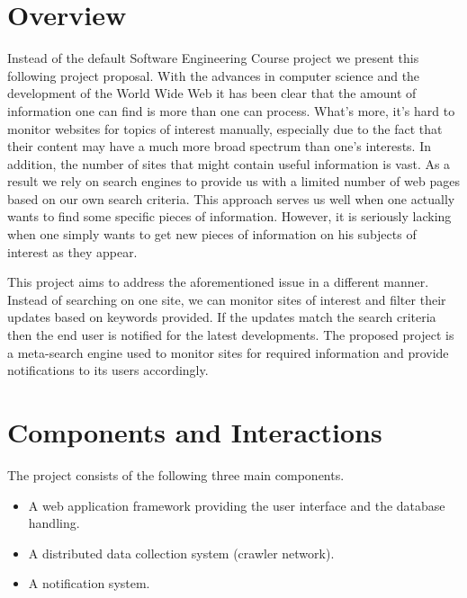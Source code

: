 \documentclass[a4paper,10pt]{article} \usepackage{anysize}
\begin{document}



\section{Overview}
    Instead of the default Software Engineering Course project we present
    this following project proposal. With the advances in computer science and
    the development of the World Wide Web it has been clear that the amount
    of information one can find is more than one can process. What's more, it's
    hard to monitor websites for topics of interest manually, especially due to
    the fact that their content may have a much more broad spectrum than one's
    interests. In addition, the number of sites that might contain useful
    information is vast. As a result we rely on search engines to provide us
    with a limited number of web pages based on our own search criteria. This
    approach serves us well when one actually wants to find some specific
    pieces of information. However, it is seriously lacking when one simply
    wants to get new pieces of information on his subjects of interest as they
    appear. 

    This project aims to address the aforementioned issue in a different
    manner. Instead of searching on one site, we can monitor sites of
    interest and filter their updates based on keywords provided. If the
    updates match the search criteria then the end user is notified for the
    latest developments. The proposed project is a meta-search engine used to
    monitor sites for required information and provide notifications to its
    users accordingly. 

\section{Components and Interactions}
    The project consists of the following three main components.
    \begin{itemize}
        \item A web application framework providing the user interface and the
            database handling.
        \item A distributed data collection system (crawler network).
        \item A notification system.
    \end{itemize}
\end{document}
